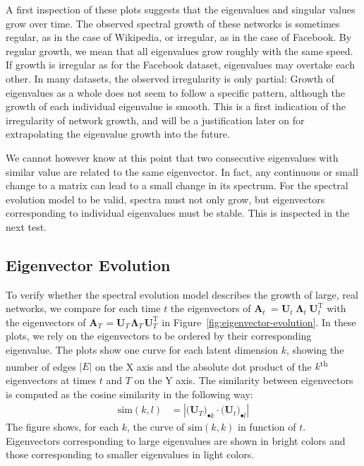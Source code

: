 \documentclass[11pt,a4paper]{book}
\newcommand{\totaltime}{T} %
\begin{document}
A first inspection of these plots suggests that the eigenvalues and
singular values grow over time.   
The observed spectral growth of these networks is sometimes
regular, as in the case of Wikipedia, or irregular, as in the case of
Facebook.  By regular growth, we mean that all eigenvalues grow roughly
with the same speed.  If growth is irregular as for the Facebook
dataset, eigenvalues may overtake each other. 
In many datasets, the observed irregularity is only partial:  Growth of
eigenvalues as a whole does not seem to follow a specific pattern,
although the growth of each individual eigenvalue is smooth. 
This is a first indication of the irregularity of network growth,
and will be a justification later on for extrapolating the eigenvalue
growth into the future. 

We cannot however know at this point that two consecutive eigenvalues with
similar value are related to the same eigenvector.  In fact, any
continuous or small change to a matrix can lead to a small 
change in its spectrum.  
For the spectral evolution model to be valid, spectra must not only
grow, but eigenvectors corresponding to individual eigenvalues must be
stable.  This is inspected in the next test. 

\subsection{Eigenvector Evolution}
\label{sec:eigenvector-evolution}
To verify whether the spectral evolution model describes the growth of
large, real networks, we compare for each time $t$ the eigenvectors of
$\mathbf A_{t}^{\phantom {\mathrm T}}=\mathbf U_{t}^{\phantom
  {\mathrm T}} \mathbf \Lambda_{t}^{\phantom {\mathrm T}} \mathbf
U_{t}^{\mathrm T}$ with the eigenvectors of $\mathbf
A_{\totaltime}^{\phantom {\mathrm T}}=\mathbf
U_{\totaltime}^{\phantom {\mathrm T}} \mathbf
\Lambda_{\totaltime}^{\phantom {\mathrm T}} \mathbf
U_{\totaltime}^{\mathrm T}$ in Figure~\ref{fig:eigenvector-evolution}.
In these plots, we rely on the eigenvectors to be ordered by their
corresponding eigenvalue.  The plots show one curve for each latent
dimension $k$, showing the number of edges $|E|$ on the X axis and the absolute dot
product of the $k$\textsuperscript{th} eigenvectors at times $t$ and
$\totaltime$ on the Y axis.  The similarity between eigenvectors is
computed as the cosine similarity in the following way:
\begin{align}
  \mathrm{sim}(k,l) &= \left| \mathbf
  (\mathbf U_{\totaltime})_{\bullet k} \cdot \mathbf
  (\mathbf U_{t})_{\bullet l} \right|  
  \label{eq:eigenvector-similarity}
\end{align}
The figure shows, for each $k$, the curve of
$\mathrm{sim}(k,k)$ in function of $t$. 
Eigenvectors corresponding to large eigenvalues are
shown in bright colors and those corresponding to smaller eigenvalues in
light colors.
\end{document}
